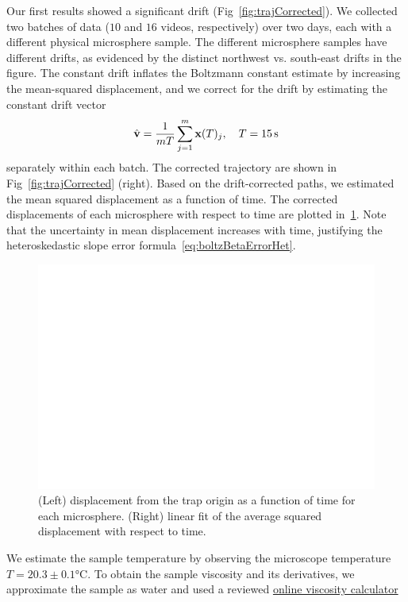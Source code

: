 \documentclass[aps,prb,twocolumn,superscriptaddress,floatfix,longbibliography,citeautoscript]{revtex4-2}
\begin{document}
Our first results showed a significant drift (Fig~\ref{fig:trajCorrected}). We collected two batches of data ($10$ and $16$ videos, respectively) over two days, each with a different physical microsphere sample. The different microsphere samples have different drifts, as evidenced by the distinct northwest vs. south-east drifts in the figure. The constant drift inflates the Boltzmann constant estimate by increasing the mean-squared displacement, and we correct for the drift by estimating the constant drift vector 
\[ 
    \hat{\mathbf v} = \dfrac 1 {mT} \sum_{j=1}^m \mathbf{x}(T)_j, \quad T=\SI{15}{\second} 
\]
separately within each batch. The corrected trajectory are shown in Fig~\ref{fig:trajCorrected} (right). Based on the drift-corrected paths, we estimated the mean squared displacement as a function of time. The corrected displacements of each microsphere with respect to time are plotted in~\ref{fig:dispCorrected}. Note that the uncertainty in mean displacement increases with time, justifying the heteroskedastic slope error formula~\ref{eq:boltzBetaErrorHet}. 
\begin{figure}
    \centering
    \includegraphics[width=1\linewidth]{Second_draft/figs/displacements.png}
    \caption{(Left) displacement from the trap origin as a function of time for each microsphere.  (Right) linear fit of the average squared displacement with respect to time. }
    \label{fig:dispCorrected}
\end{figure}
We estimate the sample temperature by observing the microscope temperature 
$T=20.3\pm 0.1\si{\degreeCelsius}$. To obtain the sample viscosity and its derivatives, we approximate the sample as water and 
used a reviewed \href{https://www.omnicalculator.com/physics/water-viscosity}{online viscosity calculator}
\end{document}
